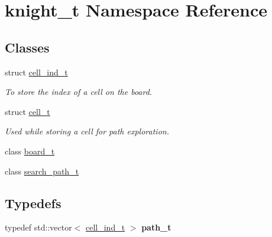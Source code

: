 \hypertarget{namespaceknight__t}{\section{knight\-\_\-t \-Namespace \-Reference}
\label{namespaceknight__t}
}
\subsection*{\-Classes}
\begin{DoxyCompactItemize}
\item 
struct \hyperlink{structknight__t_1_1cell__ind__t}{cell\-\_\-ind\-\_\-t}
\begin{DoxyCompactList}\small\item\em \-To store the index of a cell on the board. \end{DoxyCompactList}\item 
struct \hyperlink{structknight__t_1_1cell__t}{cell\-\_\-t}
\begin{DoxyCompactList}\small\item\em \-Used while storing a cell for path exploration. \end{DoxyCompactList}\item 
class \hyperlink{classknight__t_1_1board__t}{board\-\_\-t}
\item 
class \hyperlink{classknight__t_1_1search__path__t}{search\-\_\-path\-\_\-t}
\end{DoxyCompactItemize}
\subsection*{\-Typedefs}
\begin{DoxyCompactItemize}
\item 
\hypertarget{namespaceknight__t_a8acffa8e59123add8085f0e9988a4240}{typedef std\-::vector$<$ \hyperlink{structknight__t_1_1cell__ind__t}{cell\-\_\-ind\-\_\-t} $>$ {\bfseries path\-\_\-t}}\label{namespaceknight__t_a8acffa8e59123add8085f0e9988a4240}

\end{DoxyCompactItemize}

